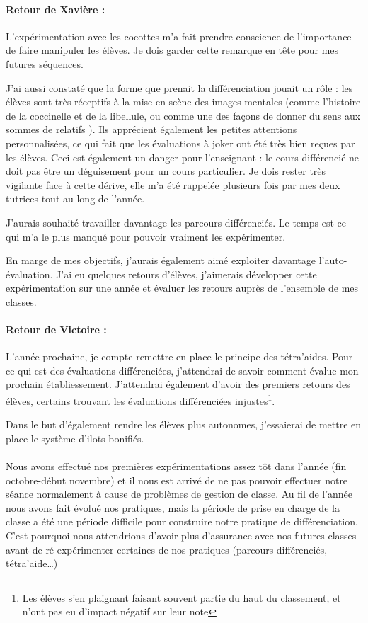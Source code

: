 \paragraph*{Retour de Xavière :}

L'expérimentation avec les cocottes m'a fait prendre conscience de l'importance de faire manipuler les élèves. Je dois garder cette remarque en tête pour mes futures séquences.

 J'ai aussi constaté que la forme que prenait la différenciation jouait un rôle : les élèves sont très réceptifs à la mise en scène des images mentales (comme l'histoire de la coccinelle et de la libellule, ou comme une des façons de donner du sens aux sommes de relatifs \cite{memoire_baguette}). Ils apprécient également les petites attentions personnalisées, ce qui fait que les évaluations à joker ont été très bien reçues par les élèves. Ceci est également un danger pour l'enseignant : le cours différencié ne doit pas être un déguisement pour un cours particulier. Je dois rester très vigilante face à cette dérive, elle m'a été rappelée plusieurs fois par mes deux tutrices tout au long de l'année.

 J'aurais souhaité travailler davantage les parcours différenciés. Le temps est ce qui m'a le plus manqué pour pouvoir vraiment les expérimenter.

En marge de mes objectifs, j'aurais également aimé exploiter davantage l'auto-évaluation. J'ai eu quelques retours d'élèves, j'aimerais développer cette expérimentation sur une année et évaluer les retours auprès de l'ensemble de mes classes.

\paragraph*{Retour de Victoire :}
L'année prochaine, je compte remettre en place le principe des tétra'aides. Pour ce
qui est des évaluations différenciées, j'attendrai de savoir comment évalue mon prochain
établiessement. J'attendrai également d'avoir des premiers retours des élèves,
certains trouvant les évaluations différenciées injustes\footnote{Les élèves s'en
plaignant faisant souvent partie du haut du classement, et n'ont pas eu d'impact négatif
sur leur note}.

Dans le but d'également rendre les élèves plus autonomes, j'essaierai de mettre
en place le système d'ilots bonifiés.

\paragraph*{}
Nous avons effectué nos premières expérimentations assez tôt dans l'année (fin octobre-début novembre) et il nous est arrivé de ne pas pouvoir effectuer notre séance normalement à cause de problèmes de gestion de classe. Au fil de l'année nous avons fait évolué nos pratiques, mais la période de prise en charge de la classe a été une période difficile pour construire notre pratique de différenciation. C'est pourquoi nous attendrions d'avoir plus d'assurance avec nos futures classes avant de ré-expérimenter certaines de nos pratiques (parcours différenciés, tétra'aide…)
